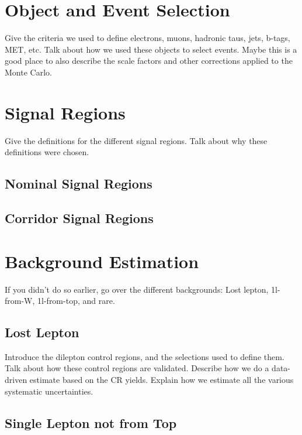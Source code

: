 \section{Object and Event Selection}
\label{sec:stop:selections}

Give the criteria we used to define electrons, muons, hadronic taus,
jets, b-tags, MET, etc.
Talk about how we used these objects to select events.
Maybe this is a good place to also describe the scale factors and
other corrections applied to the Monte Carlo.

\section{Signal Regions}
\label{sec:stop:sigregs}

Give the definitions for the different signal regions.
Talk about why these definitions were chosen.

\subsection{Nominal Signal Regions}
\label{ssec:stop:nominalsrs}

\subsection{Corridor Signal Regions}
\label{ssec:stop:corridorsrs}



\section{Background Estimation}
\label{sec:stop:bkgest}

If you didn't do so earlier, go over the different backgrounds:
Lost lepton, 1l-from-W, 1l-from-top, and rare.

\subsection{Lost Lepton}
\label{ssec:stop:lostlep}

Introduce the dilepton control regions, and the selections used
to define them.
Talk about how these control regions are validated.
Describe how we do a data-driven estimate based on the CR yields.
Explain how we estimate all the various systematic uncertainties.

\subsection{Single Lepton not from Top}
\label{ssec:stop:1lw}

